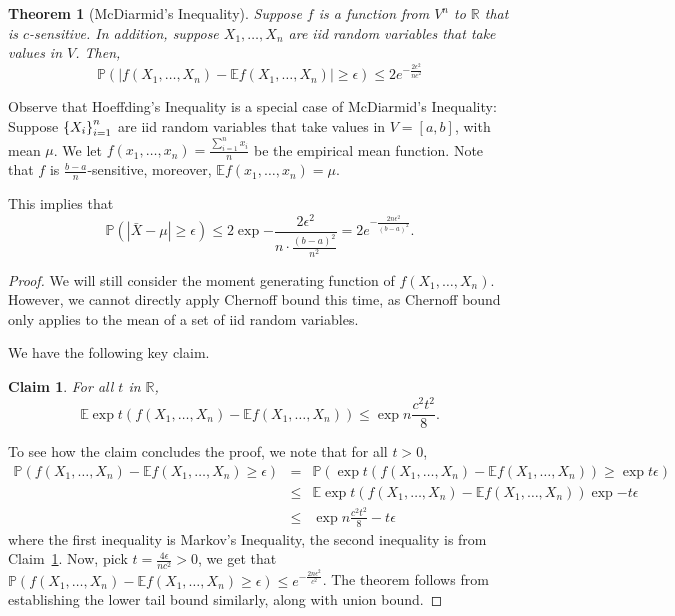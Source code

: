 \documentclass{article}
\newtheorem{theorem}{Theorem}
\newtheorem{claim}{Claim}
\newcommand{\RR}{\mathbb{R}} %
\newcommand{\EE}{\mathbb{E}} %
\newcommand{\PP}{\mathbb{P}} %
\begin{document}
\begin{theorem}[McDiarmid's Inequality]
Suppose $f$ is a function from $V^n$ to $\RR$ that is $c$-sensitive. In addition, suppose $X_1, \ldots, X_n$ are iid random variables that take values in $V$. Then,
\[ \PP( | f(X_1, \ldots, X_n) - \EE f(X_1, \ldots, X_n) | \geq \epsilon)
  \leq 2 e^{-\frac{2 \epsilon^2}{n c^2}} \]
\end{theorem}

Observe that Hoeffding's Inequality is a special case of McDiarmid's Inequality:
Suppose $\cbr{X_i}_{i=1}^n$ are iid random variables that take values in $V = [a,b]$, with mean $\mu$. We let $f(x_1, \ldots, x_n) = \frac{\sum_{i=1}^n x_i}{n}$
be the empirical mean function. Note that
$f$ is $\frac{b-a}{n}$-sensitive, moreover, $\EE f(x_1,\ldots,x_n) = \mu$.

This implies that
\[
\PP(|\bar{X} - \mu| \geq \epsilon) \leq 2 \exp{-\frac{2 \epsilon^2}{n \cdot \frac{(b-a)^2}{n^2}}} = 2 e^{-\frac{2 n \epsilon^2}{(b-a)^2}}.
\]

\begin{proof}
We will still consider the moment generating function of $f(X_1,\ldots,X_n)$.
However, we cannot directly apply Chernoff bound this time, as Chernoff bound only applies to the mean of a set of iid random variables.

We have the following key claim.
\begin{claim}
For all $t$ in $\RR$,
\[ \EE \exp{t(f(X_1,\ldots,X_n) - \EE f(X_1,\ldots,X_n))} \leq \exp{n \frac{c^2 t^2}{8}}. \]
\label{claim:mgf}
\end{claim}

To see how the claim concludes the proof, we note that for all $t > 0$,
\begin{eqnarray*}
\PP(f(X_1,\ldots,X_n) - \EE f(X_1,\ldots,X_n) \geq \epsilon)
&=& \PP(\exp{t(f(X_1,\ldots,X_n) - \EE f(X_1,\ldots,X_n))} \geq \exp{t \epsilon}) \\
&\leq& \EE \exp{t(f(X_1,\ldots,X_n) - \EE f(X_1,\ldots,X_n))} \exp{-t \epsilon} \\
&\leq& \exp{n \frac{c^2 t^2}{8} - t \epsilon}
\end{eqnarray*}
where the first inequality is Markov's Inequality, the second inequality is
from Claim~\ref{claim:mgf}. Now, pick $t = \frac{4 \epsilon}{n c^2} > 0$, we get that
$\PP(f(X_1,\ldots,X_n) - \EE f(X_1,\ldots,X_n) \geq \epsilon) \leq e^{-\frac{2 n \epsilon^2}{c^2}}$. The theorem follows from establishing the lower tail bound similarly, along with union bound.
\end{proof}
\end{document}
